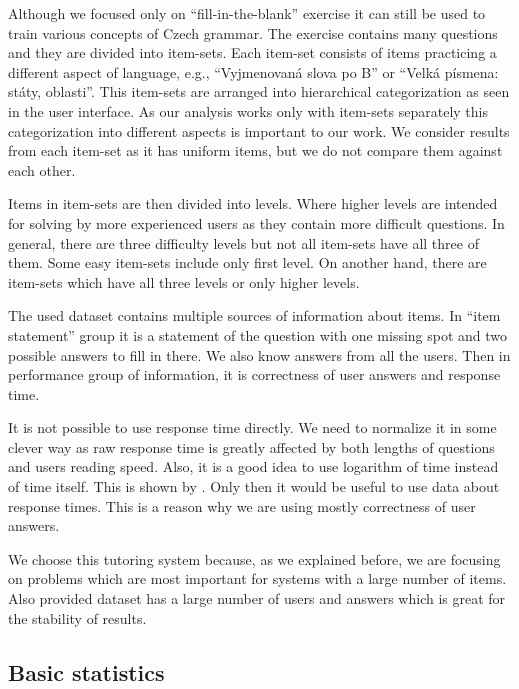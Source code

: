 \documentclass[
  digital, %
  table,   %
  nolof,     %
  nolot,     %
  nocover,
  color
]{fithesis3}
\begin{document}
Although we focused only on ``fill-in-the-blank'' exercise it can still be used to train various concepts of Czech grammar. The exercise contains many questions and they are divided into item-sets. Each item-set consists of items practicing a different aspect of language, e.g., ``Vyjmenovaná slova po B'' or ``Velká písmena: státy, oblasti''. This item-sets are arranged into hierarchical categorization as seen in the user interface. As our analysis works only with item-sets separately this categorization into different aspects is important to our work. We consider results from each item-set as it has uniform items, but we do not compare them against each other.

Items in item-sets are then divided into levels. Where higher levels are intended for solving by more experienced users as they contain more difficult questions. In general, there are three difficulty levels but not all item-sets have all three of them. Some easy item-sets include only first level. On another hand, there are item-sets which have all three levels or only higher levels.


The used dataset contains multiple sources of information about items. In ``item statement'' group it is a statement of the question with one missing spot and two possible answers to fill in there. We also know answers from all the users. Then in performance group of information, it is correctness of user answers and response time.

It is not possible to use response time directly. We need to normalize it in some clever way as raw response time is greatly affected by both lengths of questions and users reading speed. Also, it is a good idea to use logarithm of time instead of time itself. This is shown by \citeauthor{niznan2014using}\cite{niznan2014using}. Only then it would be useful to use data about response times. This is a reason why we are using mostly correctness of user answers.


We choose this tutoring system because, as we explained before, we are focusing on problems which are most important for systems with a large number of items. Also provided dataset has a large number of users and answers which is great for the stability of results.


\subsection{Basic statistics}\label{basic-statistics}
\end{document}
